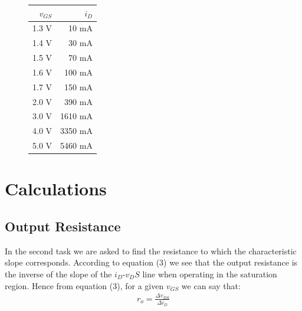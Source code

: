 \documentclass{article}
\begin{document}
\begin{figure}[H]
\begin{minipage}{.5\textwidth}
\begin{tabular}{ | r | r | }
    \hline
    $v_{GS}$ & $i_D$ \\ \hline
      1.3 \si{\volt} & 10 \si{\milli \ampere}  \\ \hline
      1.4 \si{\volt} & 30 \si{\milli \ampere}  \\ \hline
      1.5 \si{\volt} & 70 \si{\milli \ampere}  \\ \hline
      1.6 \si{\volt} & 100 \si{\milli \ampere}  \\ \hline
      1.7 \si{\volt} & 150 \si{\milli \ampere}  \\ \hline
      2.0 \si{\volt} & 390 \si{\milli \ampere}  \\ \hline
      3.0 \si{\volt} & 1610 \si{\milli \ampere}  \\ \hline
      4.0 \si{\volt} & 3350 \si{\milli \ampere}  \\ \hline
      5.0 \si{\volt} & 5460 \si{\milli \ampere}  \\ \hline
\end{tabular}
\end{minipage}
\end{figure}

\newpage


\section{Calculations}

\subsection{Output Resistance}
In the second task we are asked to find the resistance to which the characteristic slope corresponds. According to equation (3) we see that the output resistance is the inverse of the slope of the $i_D$-$v_DS$ line when operating in the saturation region. Hence from equation (3), for a given $v_{GS}$ we can say that:
\begin{align*}
r_o = \frac{\Delta v_{DS}}{\Delta i_D}
\end{align*}
\end{document}
